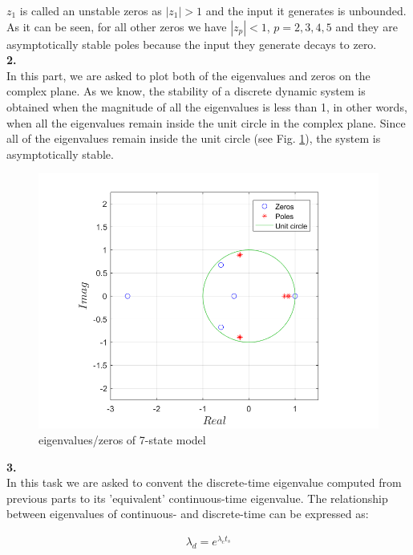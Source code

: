 \documentclass[paper=US leter, fontsize=11pt]{scrartcl}
\begin{document}
\vspace{20pt}
$z_{1}$ is called an unstable zeros as $|z_{1}|>1$ and the input it generates is unbounded. As it can be seen, for all other zeros we have $|z_{p}|<1$, $p=2,3,4,5$ and they are asymptotically stable poles because the input they generate decays to zero.\\

\vspace{30pt}
\textbf{2.}\\
In this part, we are asked to plot both of the eigenvalues and zeros on the complex plane. As we know, the stability of a discrete dynamic system is obtained when the magnitude of all the eigenvalues is less than 1, in other words, when all the eigenvalues remain inside the unit circle in the complex plane. Since all of the eigenvalues remain inside the unit circle (see Fig. \ref{task22}), the system is asymptotically stable.

\begin{figure}[ht!]  
	\centering    
	\includegraphics[scale=0.6,trim={1cm 0 0 0},clip]{task22.png}  
	\caption{eigenvalues/zeros of 7-state model}
	\label{task22} 
\end{figure} 
\vspace{30pt}
\textbf{3.}\\
In this task we are asked to convent the discrete-time eigenvalue computed from previous parts to its 'equivalent' continuous-time eigenvalue. The relationship between eigenvalues of continuous- and discrete-time can be expressed as:

\begin{gather}
\lambda_{d} = e^{\lambda_{c}t_{s}}
\tag{3}
\end{gather} 
\end{document}
